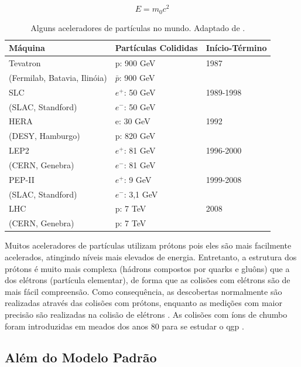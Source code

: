 \begin{equation} \label{eq:einstein}
E=m_0c^2
\end{equation}

\begin{table}
\centering
\begin{tabular}{lll}
\hline \hline \hline
\textbf{Máquina} & \textbf{Partículas Colididas} & \textbf{Início-Término} \\
\hline \hline
Tevatron & p: 900 GeV & 1987 \\
(Fermilab, Batavia, Ilinóia) & $\bar{p}$: 900 GeV & \\
\hline
SLC & $e^{+}$: 50 GeV & 1989-1998 \\
(SLAC, Standford) & $e^{-}$: 50 GeV & \\
\hline
HERA & e: 30 GeV & 1992 \\
(DESY, Hamburgo) & p: 820 GeV & \\
\hline
LEP2 & $e^{+}$: 81 GeV & 1996-2000 \\
(CERN, Genebra) & $e^{-}$: 81 GeV & \\
\hline
PEP-II & $e^{+}$: 9 GeV & 1999-2008 \\
(SLAC, Standford) & $e^{-}$: 3,1 GeV & \\
\hline
LHC & p: 7 TeV & 2008 \\
(CERN, Genebra) & p: 7 TeV & \\
\hline \hline
\end{tabular}
\caption[Alguns aceleradores de partículas no mundo]{Alguns aceleradores de partículas no mundo. Adaptado de \cite{Intro_Standard}.}
\label{tab:aceleradores}
\end{table}


Muitos aceleradores de partículas utilizam prótons pois eles são mais facilmente
acelerados, atingindo níveis mais elevados de energia. Entretanto, a
estrutura dos prótons é muito mais complexa (hádrons
compostos por quarks e gluôns) que a dos elétrons (partícula elementar), de forma que as colisões com elétrons são 
de mais fácil compreensão. Como consequência, as
descobertas normalmente são realizadas através das colisões com prótons, enquanto as medições com
maior precisão são realizadas na colisão de elétrons \cite{nature_space_and_time}.
As colisões com íons de chumbo foram introduzidas em meados dos anos 80
para se estudar o \gls{qgp} \cite{heavy_ions}.

\subsection{Além do Modelo Padrão}
\label{ssec:alem_do_mp}

